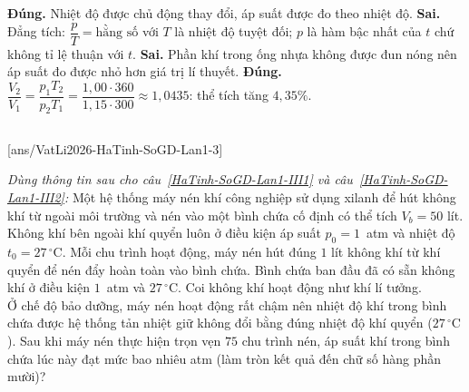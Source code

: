\begin{ex}
{\begin{itemchoice}
				\itemch \textbf{Đúng.} Nhiệt độ được chủ động thay đổi, áp suất được đo theo nhiệt độ.
				\itemch \textbf{Sai.} Đẳng tích: $\dfrac{p}{T}=\text{hằng số}$ với $T$ là nhiệt độ tuyệt đối; $p$ là hàm bậc nhất của $t$ chứ không tỉ lệ thuận với $t$.
				\itemch \textbf{Sai.} Phần khí trong ống nhựa không được đun nóng nên áp suất đo được nhỏ hơn giá trị lí thuyết.
				\itemch \textbf{Đúng.} $\dfrac{V_2}{V_1}=\dfrac{p_1T_2}{p_2T_1}=\dfrac{1{,}00\cdot 360}{1{,}15\cdot 300}\approx 1{,}0435$: thể tích tăng $4{,}35\%$.
			\end{itemchoice}
		}
	\end{ex}

	\subsection*{}
	\setcounter{ex}{0}
	[ans/VatLi2026-HaTinh-SoGD-Lan1-3]

	\begin{ex}%
		\label{HaTinh-SoGD-Lan1-III1}
		\textit{Dùng thông tin sau cho câu~\ref{HaTinh-SoGD-Lan1-III1} và câu~\ref{HaTinh-SoGD-Lan1-III2}:} Một hệ thống máy nén khí công nghiệp sử dụng xilanh để hút không khí từ ngoài môi trường và nén vào một bình chứa cố định có thể tích $V_b=50$ lít. Không khí bên ngoài khí quyển luôn ở điều kiện áp suất $p_0=1$~atm và nhiệt độ $t_0=27\,^\circ\text{C}$. Mỗi chu trình hoạt động, máy nén hút đúng $1$ lít không khí từ khí quyển để nén đẩy hoàn toàn vào bình chứa. Bình chứa ban đầu đã có sẵn không khí ở điều kiện $1$~atm và $27\,^\circ\text{C}$. Coi không khí hoạt động như khí lí tưởng.\\
		Ở chế độ bảo dưỡng, máy nén hoạt động rất chậm nên nhiệt độ khí trong bình chứa được hệ thống tản nhiệt giữ không đổi bằng đúng nhiệt độ khí quyển ($27\,^\circ\text{C}$). Sau khi máy nén thực hiện trọn vẹn $75$ chu trình nén, áp suất khí trong bình chứa lúc này đạt mức bao nhiêu atm (làm tròn kết quả đến chữ số hàng phần mười)?
		\par
	\end{ex}

